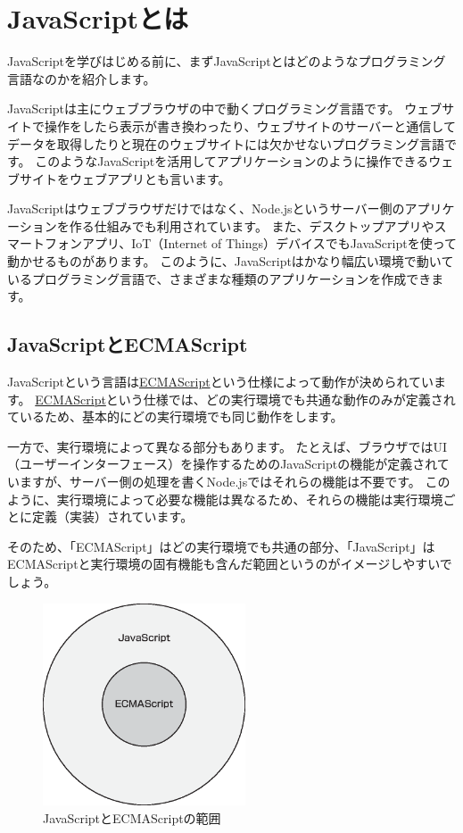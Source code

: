 \hypertarget{what-is-javascript}{%
\chapter{JavaScriptとは}\label{what-is-javascript}}
\thispagestyle{frontheadings}

JavaScriptを学びはじめる前に、まずJavaScriptとはどのようなプログラミング言語なのかを紹介します。

JavaScriptは主にウェブブラウザの中で動くプログラミング言語です。
ウェブサイトで操作をしたら表示が書き換わったり、ウェブサイトのサーバーと通信してデータを取得したりと現在のウェブサイトには欠かせないプログラミング言語です。
このようなJavaScriptを活用してアプリケーションのように操作できるウェブサイトをウェブアプリとも言います。

JavaScriptはウェブブラウザだけではなく、Node.jsというサーバー側のアプリケーションを作る仕組みでも利用されています。
また、デスクトップアプリやスマートフォンアプリ、IoT（Internet of Things）デバイスでもJavaScriptを使って動かせるものがあります。
このように、JavaScriptはかなり幅広い環境で動いているプログラミング言語で、さまざまな種類のアプリケーションを作成できます。

\hypertarget{javascript-ecmascript}{%
\section{JavaScriptとECMAScript}\label{javascript-ecmascript}}

JavaScriptという言語は\hyperlink{ecmascript}{ECMAScript}という仕様によって動作が決められています。
\hyperlink{ecmascript}{ECMAScript}という仕様では、どの実行環境でも共通な動作のみが定義されているため、基本的にどの実行環境でも同じ動作をします。

一方で、実行環境によって異なる部分もあります。
たとえば、ブラウザではUI（ユーザーインターフェース）を操作するためのJavaScriptの機能が定義されていますが、サーバー側の処理を書くNode.jsではそれらの機能は不要です。
このように、実行環境によって必要な機能は異なるため、それらの機能は実行環境ごとに定義（実装）されています。

そのため、「ECMAScript」はどの実行環境でも共通の部分、「JavaScript」はECMAScriptと実行環境の固有機能も含んだ範囲というのがイメージしやすいでしょう。

\begin{figure}
\centering
\includegraphics[width=60mm]{./fig/javascript-ecmascript.eps}
\caption{JavaScriptとECMAScriptの範囲}
\end{figure}


